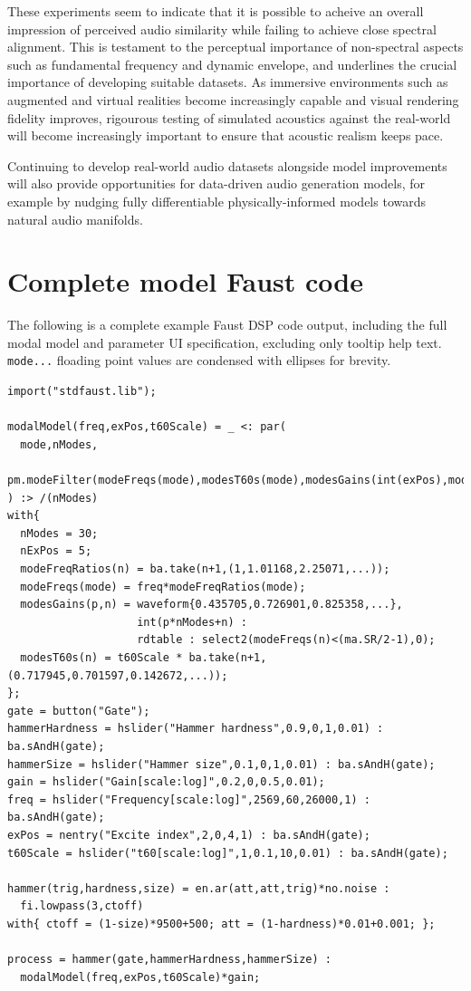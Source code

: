 \documentclass[12pt]{article}
\begin{document}
These experiments seem to indicate that it is possible to acheive an overall impression of perceived audio similarity while failing to achieve close spectral alignment.
This is testament to the perceptual importance of non-spectral aspects such as fundamental frequency and dynamic envelope, and underlines the crucial importance of developing suitable datasets.
As immersive environments such as augmented and virtual realities become increasingly capable and visual rendering fidelity improves, rigourous testing of simulated acoustics against the real-world will become increasingly important to ensure that acoustic realism keeps pace.

Continuing to develop real-world audio datasets alongside model improvements will also provide opportunities for data-driven audio generation models, for example by nudging fully differentiable physically-informed models \cite{engel_ddsp_2019} \cite{wang_neural_2019} towards natural audio manifolds.




\newpage

\appendix

\section{Complete model Faust code}
\label{sec:FaustCode}
The following is a complete example Faust DSP code output, including the full modal model and parameter UI specification, excluding only tooltip help text.
\verb|mode...| floading point values are condensed with ellipses for brevity.

\begin{small}
\begin{verbatim}
import("stdfaust.lib");

modalModel(freq,exPos,t60Scale) = _ <: par(
  mode,nModes,
  pm.modeFilter(modeFreqs(mode),modesT60s(mode),modesGains(int(exPos),mode))
) :> /(nModes)
with{
  nModes = 30;
  nExPos = 5;
  modeFreqRatios(n) = ba.take(n+1,(1,1.01168,2.25071,...));
  modeFreqs(mode) = freq*modeFreqRatios(mode);
  modesGains(p,n) = waveform{0.435705,0.726901,0.825358,...},
                    int(p*nModes+n) :
                    rdtable : select2(modeFreqs(n)<(ma.SR/2-1),0);
  modesT60s(n) = t60Scale * ba.take(n+1,(0.717945,0.701597,0.142672,...));
};
gate = button("Gate");
hammerHardness = hslider("Hammer hardness",0.9,0,1,0.01) : ba.sAndH(gate);
hammerSize = hslider("Hammer size",0.1,0,1,0.01) : ba.sAndH(gate);
gain = hslider("Gain[scale:log]",0.2,0,0.5,0.01);
freq = hslider("Frequency[scale:log]",2569,60,26000,1) : ba.sAndH(gate);
exPos = nentry("Excite index",2,0,4,1) : ba.sAndH(gate);
t60Scale = hslider("t60[scale:log]",1,0.1,10,0.01) : ba.sAndH(gate);
 
hammer(trig,hardness,size) = en.ar(att,att,trig)*no.noise :
  fi.lowpass(3,ctoff)
with{ ctoff = (1-size)*9500+500; att = (1-hardness)*0.01+0.001; };
 
process = hammer(gate,hammerHardness,hammerSize) :
  modalModel(freq,exPos,t60Scale)*gain;
\end{verbatim}
\end{small}
\end{document}
